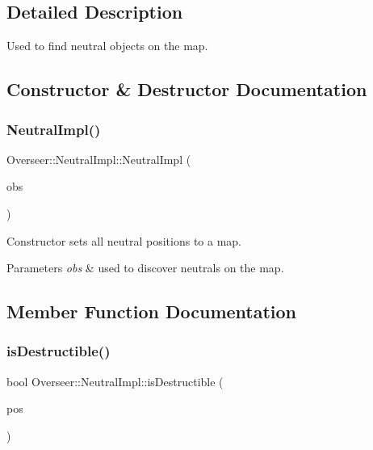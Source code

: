 \subsection{Detailed Description}
Used to find neutral objects on the map. 

\subsection{Constructor \& Destructor Documentation}
\mbox{\label{structOverseer_1_1NeutralImpl_a2ef6e7f65f2c6de6bc6beda0f020ba62}} 
\subsubsection{\texorpdfstring{Neutral\+Impl()}{NeutralImpl()}}
{\footnotesize\ttfamily Overseer\+::\+Neutral\+Impl\+::\+Neutral\+Impl (\begin{DoxyParamCaption}\item[{const sc2\+::\+Observation\+Interface $\ast$}]{obs }\end{DoxyParamCaption})}



Constructor sets all neutral positions to a map. 


\begin{DoxyParams}{Parameters}
{\em obs} & used to discover neutrals on the map. \\
\hline
\end{DoxyParams}


\subsection{Member Function Documentation}
\mbox{\label{structOverseer_1_1NeutralImpl_af8393ea00dad811b9132403e73d68f83}} 
\subsubsection{\texorpdfstring{is\+Destructible()}{isDestructible()}}
{\footnotesize\ttfamily bool Overseer\+::\+Neutral\+Impl\+::is\+Destructible (\begin{DoxyParamCaption}\item[{sc2\+::\+Point2D \&}]{pos }\end{DoxyParamCaption})}



